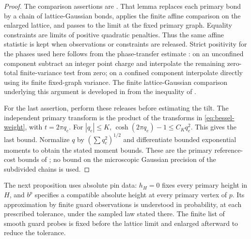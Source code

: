 \begin{proof}
The comparison assertions are \cite[Lemma~2.2]{C}.  That lemma replaces
each primary bond by a chain of lattice-Gaussian bonds, applies the
finite affine comparison on the enlarged lattice, and passes to the
limit at the fixed primary graph.  Equality constraints are limits
of positive quadratic penalties.  Thus the same affine statistic is
kept when observations or constraints are released.
Strict positivity for the phases used here follows from the
phase-transfer estimate \cite[Equation~(2.2) and its proof]{C}: on an
unconfined component subtract an integer point charge and interpolate
the remaining zero-total finite-variance test from zero; on a confined
component interpolate directly using its finite fixed-graph variance.
The finite lattice-Gaussian comparison underlying this argument is
developed in \cite[Lemma~2.1]{B} from the inequality of
\cite[Theorem~2.1 in the arXiv version]{RSD2017}.

For the last assertion, perform these releases before estimating the
tilt.  The independent primary transform is the product of the
transforms in \eqref{eq:bessel-weight}, with \(t=2\pi q_e\).
For \(|q_e|\le K\),
\(\cosh(2\pi q_e)-1\le C_Kq_e^2\).  This gives the last bound.
Normalize \(q\) by \((\sum q_e^2)^{1/2}\) and differentiate bounded
exponential moments to obtain the stated moment bounds.  These are
the primary reference-cost bounds of \cite[Lemma~2.3]{C}; no bound
on the microscopic Gaussian precision of the subdivided chains is
used.
\end{proof}

The next proposition uses absolute pin data: \(h_H=0\) fixes every
primary height in \(H\), and \(b^p\) specifies a compatible absolute
height at every primary vertex of \(p\).  Its approximation by finite
guard observations is understood in probability, at each prescribed
tolerance, under the sampled law stated there.  The finite list of
smooth guard probes is fixed before the lattice limit and enlarged
afterward to reduce the tolerance.

